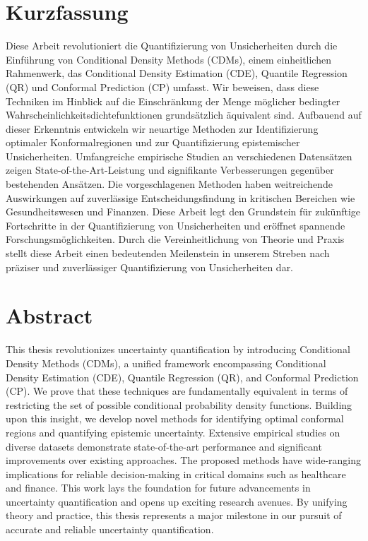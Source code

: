
{%
	\chapter*{Kurzfassung}
	
	Diese Arbeit revolutioniert die Quantifizierung von Unsicherheiten durch die Einführung von Conditional Density Methods (CDMs), einem einheitlichen Rahmenwerk, das Conditional Density Estimation (CDE), Quantile Regression (QR) und Conformal Prediction (CP) umfasst. Wir beweisen, dass diese Techniken im Hinblick auf die Einschränkung der Menge möglicher bedingter Wahrscheinlichkeitsdichtefunktionen grundsätzlich äquivalent sind. Aufbauend auf dieser Erkenntnis entwickeln wir neuartige Methoden zur Identifizierung optimaler Konformalregionen und zur Quantifizierung epistemischer Unsicherheiten. Umfangreiche empirische Studien an verschiedenen Datensätzen zeigen State-of-the-Art-Leistung und signifikante Verbesserungen gegenüber bestehenden Ansätzen. Die vorgeschlagenen Methoden haben weitreichende Auswirkungen auf zuverlässige Entscheidungsfindung in kritischen Bereichen wie Gesundheitswesen und Finanzen. Diese Arbeit legt den Grundstein für zukünftige Fortschritte in der Quantifizierung von Unsicherheiten und eröffnet spannende Forschungsmöglichkeiten. Durch die Vereinheitlichung von Theorie und Praxis stellt diese Arbeit einen bedeutenden Meilenstein in unserem Streben nach präziser und zuverlässiger Quantifizierung von Unsicherheiten dar.
}

{%
	\chapter*{Abstract}
	
	This thesis revolutionizes uncertainty quantification by introducing Conditional Density Methods (CDMs), a unified framework encompassing Conditional Density Estimation (CDE), Quantile Regression (QR), and Conformal Prediction (CP). We prove that these techniques are fundamentally equivalent in terms of restricting the set of possible conditional probability density functions. Building upon this insight, we develop novel methods for identifying optimal conformal regions and quantifying epistemic uncertainty. Extensive empirical studies on diverse datasets demonstrate state-of-the-art performance and significant improvements over existing approaches. The proposed methods have wide-ranging implications for reliable decision-making in critical domains such as healthcare and finance. This work lays the foundation for future advancements in uncertainty quantification and opens up exciting research avenues. By unifying theory and practice, this thesis represents a major milestone in our pursuit of accurate and reliable uncertainty quantification.
}
